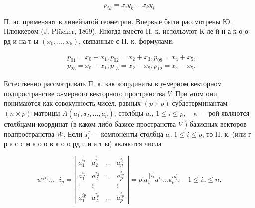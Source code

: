 \documentclass[10pt]{article}
\begin{document}
\[

p_{i k}=x_{i} y_{k}-x_{k} y_{i}

\]



П. ю. применяют в линейчатой геометрии. Впервые были рассмотрены Ю. Плюккером (J. Plücker, 1869). Иногда вместо П. к. используют $К$ ле й н а к о о рд и на т ы $\left(x_{0}, \ldots, x_{5}\right)$, свяванные с П. к. формулами:



\[

\begin{aligned}

& p_{01}=x_{0}+x_{1}, p_{02}=x_{2}+x_{3}, p_{08}=x_{4}+x_{5}, \\

& p_{23}=x_{0}-x_{1}, p_{13}=x_{2}-x_{9}, p_{12}=x_{4}-x_{5} .

\end{aligned}

\]



Естественно рассматривать П. к. как координаты в $p$-мерном векторном подпространстве $n$-мерного векторного пространства $V$. При әтом они понимаются как совокупность чисел, равных $(p \times p)$-субдетерминантам $(n \times p)$-матрицы $A\left(a_{1}, a_{2}, \ldots, a_{p}\right)$, столбцы $a_{i}$, $1 \leqslant i \leqslant p, \quad \kappa-$ рой являются столбцами координат (в каком-либо базисе пространства $V$ ) базисных векторов подпространства $W$. Если $a_{i}^{j}-$ компоненты столбца $a_{i}, 1 \leqslant i \leqslant p$, то П. к. (или г р а с с м а о о в к о о рд и н а т ы) являются числа



\[

u^{i_{1} i_{2}} \ldots \cdot i_{p}=\left|\begin{array}{cccc}

a_{1}^{i_{1}} & a_{2}^{i_{1}} & \ldots & a_{p}^{i_{1}} \\

a_{1}^{i_{2}} & a_{2}^{i_{2}} & \ldots & a_{p}^{i_{2}} \\

\vdots & \vdots & & \vdots \\

a_{1}^{i p} & a_{2}^{i_{p}} & \ldots & a_{p}^{i_{p}}

\end{array}\right|=p ! a_{1}^{\left[i_{1}\right.} a^{i_{2}} \ldots a_{p}^{i p]}, \quad 1 \leqslant i_{v} \leqslant n .

\]
\end{document}
